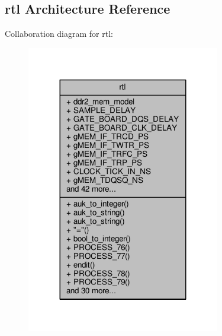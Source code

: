 \subsection{rtl Architecture Reference}
\label{classddr2__example__top__tb_1_1rtl}


Collaboration diagram for rtl\+:\nopagebreak
\begin{figure}[H]
\begin{center}
\leavevmode
\includegraphics[width=239pt]{de/d1c/classddr2__example__top__tb_1_1rtl__coll__graph}
\end{center}
\end{figure}

